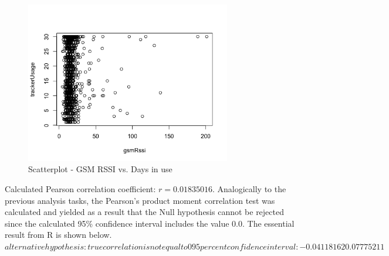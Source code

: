 \begin{enumerate}
	\begin{figure}
		\centering
		\includegraphics[width=0.8\textwidth]{img/gsmRssiVsTrackerUsagePlot.png}
		\caption{Scatterplot - GSM RSSI vs. Days in use}
		\label{fig:gsmRssiVsDaysInUse}
	\end{figure} 
	
	Calculated Pearson correlation coefficient: $r = 0.01835016$. 
	Analogically to the previous analysis tasks, the Pearson's product moment correlation test was calculated and yielded as a result that the Null hypothesis cannot be rejected since the calculated 95\% confidence interval includes the value $0.0$. The essential result from R is shown below.
	$
	alternative hypothesis: true correlation is not equal to 0
	95 percent confidence interval:
	-0.04118162  0.07775211
	$
\end{enumerate}

